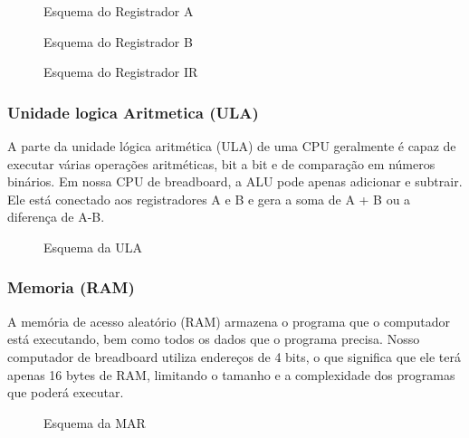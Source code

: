 \vspace{1cm}
\begin{figure}[H] \centering 
  \caption{\label{schematics_a_register} Esquema do Registrador A} 
\end{figure}

\vspace{1cm}
\begin{figure}[H] \centering 
  \caption{\label{schematics_b_register} Esquema do Registrador B} 
\end{figure}

\vspace{1cm}
\begin{figure}[H] \centering 
  \caption{\label{schematics_ir} Esquema do Registrador IR} 
\end{figure}

\subsubsection{Unidade logica Aritmetica  (ULA)}
A parte da unidade lógica aritmética (ULA) de uma CPU geralmente é capaz de executar várias operações aritméticas, bit a bit e de comparação em números binários. Em nossa CPU de breadboard, a ALU pode apenas adicionar e subtrair. Ele está conectado aos registradores A e B e gera a soma de A + B ou a diferença de A-B.

\vspace{1cm}
\begin{figure}[H] \centering 
  \caption{\label{schematics_alu} Esquema da ULA} 
\end{figure}

\subsubsection{Memoria (RAM)}
A memória de acesso aleatório (RAM) armazena o programa que o computador está executando, bem como todos os dados que o programa precisa. Nosso computador de breadboard utiliza endereços de 4 bits, o que significa que ele terá apenas 16 bytes de RAM, limitando o tamanho e a complexidade dos programas que poderá executar.

\vspace{1cm}
\begin{figure}[H] \centering 
  \caption{\label{schematics_mar} Esquema da MAR} 
\end{figure}

